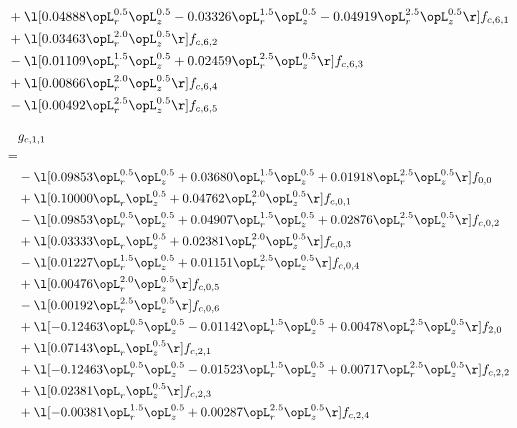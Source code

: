 \begin{alignat}{2}
& + \l[  0.04888 \opL_r^{0.5} \opL_z^{0.5}   -0.03326 \opL_r^{1.5} \opL_z^{0.5}   -0.04919 \opL_r^{2.5} \opL_z^{0.5}  \r] f_{c,6,1} \nonumber \\ 
& + \l[  0.03463 \opL_r^{2.0} \opL_z^{0.5}  \r] f_{c,6,2} \nonumber \\ 
& - \l[  0.01109 \opL_r^{1.5} \opL_z^{0.5} +  0.02459 \opL_r^{2.5} \opL_z^{0.5}  \r] f_{c,6,3} \nonumber \\ 
& + \l[  0.00866 \opL_r^{2.0} \opL_z^{0.5}  \r] f_{c,6,4} \nonumber \\ 
& - \l[  0.00492 \opL_r^{2.5} \opL_z^{0.5}  \r] f_{c,6,5} \nonumber \\ 
\end{alignat} 


\begin{alignat}{2} 
\label{eq:g_11_0} 
& g_{c,1,1} \nonumber \\ 
 = \\ 
& - \l[  0.09853 \opL_r^{0.5} \opL_z^{0.5} +  0.03680 \opL_r^{1.5} \opL_z^{0.5} +  0.01918 \opL_r^{2.5} \opL_z^{0.5}  \r] f_{0,0} \nonumber \\ 
& + \l[  0.10000 \opL_r \opL_z^{0.5} +  0.04762 \opL_r^{2.0} \opL_z^{0.5}  \r] f_{c,0,1} \nonumber \\ 
& - \l[  0.09853 \opL_r^{0.5} \opL_z^{0.5} +  0.04907 \opL_r^{1.5} \opL_z^{0.5} +  0.02876 \opL_r^{2.5} \opL_z^{0.5}  \r] f_{c,0,2} \nonumber \\ 
& + \l[  0.03333 \opL_r \opL_z^{0.5} +  0.02381 \opL_r^{2.0} \opL_z^{0.5}  \r] f_{c,0,3} \nonumber \\ 
& - \l[  0.01227 \opL_r^{1.5} \opL_z^{0.5} +  0.01151 \opL_r^{2.5} \opL_z^{0.5}  \r] f_{c,0,4} \nonumber \\ 
& + \l[  0.00476 \opL_r^{2.0} \opL_z^{0.5}  \r] f_{c,0,5} \nonumber \\ 
& - \l[  0.00192 \opL_r^{2.5} \opL_z^{0.5}  \r] f_{c,0,6} \nonumber \\ 
& + \l[  -0.12463 \opL_r^{0.5} \opL_z^{0.5}   -0.01142 \opL_r^{1.5} \opL_z^{0.5} +  0.00478 \opL_r^{2.5} \opL_z^{0.5}  \r] f_{2,0} \nonumber \\ 
& + \l[  0.07143 \opL_r \opL_z^{0.5}  \r] f_{c,2,1} \nonumber \\ 
& + \l[  -0.12463 \opL_r^{0.5} \opL_z^{0.5}   -0.01523 \opL_r^{1.5} \opL_z^{0.5} +  0.00717 \opL_r^{2.5} \opL_z^{0.5}  \r] f_{c,2,2} \nonumber \\ 
& + \l[  0.02381 \opL_r \opL_z^{0.5}  \r] f_{c,2,3} \nonumber \\ 
& + \l[  -0.00381 \opL_r^{1.5} \opL_z^{0.5} +  0.00287 \opL_r^{2.5} \opL_z^{0.5}  \r] f_{c,2,4} \nonumber \\ 

\end{alignat}
